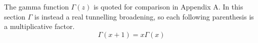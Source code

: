 \documentclass{article}
\begin{document}
The gamma function $\Gamma(z)$ is quoted for comparison in Appendix A.  In
this section $\Gamma$ is instead a real tunnelling broadening, so each
following parenthesis is a multiplicative factor.
\begin{equation}
  \Gamma(x+1)=x\Gamma(x)
\end{equation}
\end{document}

